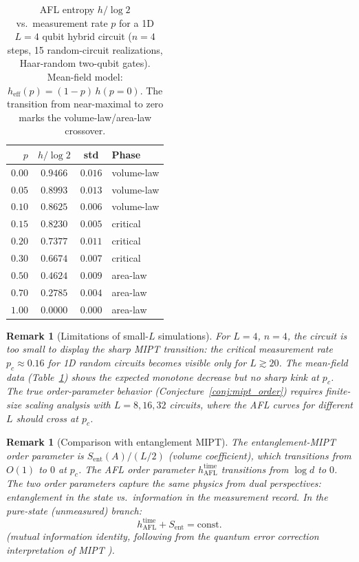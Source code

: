 \documentclass[12pt,a4paper]{article}
\newtheorem{remark}[theorem]{Remark}
\begin{document}
\begin{table}[h]
\centering
\caption{AFL entropy $h/\log 2$ vs.\ measurement rate $p$ for a 1D
  $L=4$ qubit hybrid circuit ($n=4$ steps, 15 random-circuit realizations,
  Haar-random two-qubit gates). Mean-field model: $h_{\mathrm{eff}}(p)=(1-p)\,h(p=0)$.
  The transition from near-maximal to zero marks the volume-law/area-law
  crossover.}
\begin{tabular}{r|c|c|l}
\hline
$p$ & $h/\log 2$ & std & Phase\\
\hline
$0.00$ & $0.9466$ & $0.016$ & volume-law\\
$0.05$ & $0.8993$ & $0.013$ & volume-law\\
$0.10$ & $0.8625$ & $0.006$ & volume-law\\
$0.15$ & $0.8230$ & $0.005$ & critical\\
$0.20$ & $0.7377$ & $0.011$ & critical\\
$0.30$ & $0.6674$ & $0.007$ & critical\\
$0.50$ & $0.4624$ & $0.009$ & area-law\\
$0.70$ & $0.2785$ & $0.004$ & area-law\\
$1.00$ & $0.0000$ & $0.000$ & area-law\\
\hline
\end{tabular}
\label{tab:mipt_afl}
\end{table}

\begin{remark}[Limitations of small-$L$ simulations]
For $L=4$, $n=4$, the circuit is too small to display the sharp MIPT
transition: the critical measurement rate $p_c\approx 0.16$ for 1D random
circuits \cite{skinner2019} becomes visible only for $L\gtrsim 20$.  The
mean-field data (Table~\ref{tab:mipt_afl}) shows the expected monotone
decrease but no sharp kink at $p_c$.  The true order-parameter behavior
(Conjecture~\ref{conj:mipt_order}) requires finite-size scaling analysis
with $L = 8, 16, 32$ circuits, where the AFL curves for different $L$
should cross at $p_c$.
\end{remark}

\begin{remark}[Comparison with entanglement MIPT]
The entanglement-MIPT order parameter is $S_{\mathrm{ent}}(A)/(L/2)$
(volume coefficient), which transitions from $O(1)$ to $0$ at $p_c$.
The AFL order parameter $h_{\mathrm{AFL}}^{\mathrm{time}}$ transitions
from $\log d$ to $0$.  The two order parameters capture the same physics
from dual perspectives: entanglement in the state vs.\ information in the
measurement record.  In the pure-state (unmeasured) branch:
\[
  h_{\mathrm{AFL}}^{\mathrm{time}} + S_{\mathrm{ent}} = \text{const.}
\]
(mutual information identity, following from the quantum error correction
interpretation of MIPT \cite{nag2019}).
\end{remark}
\end{document}
